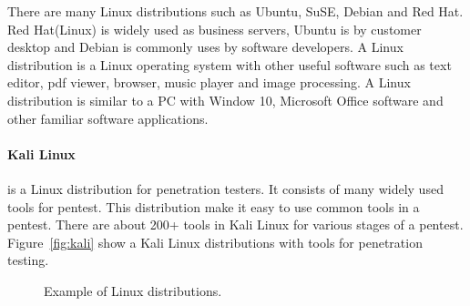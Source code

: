 \documentclass[7x9]{times}
\begin{document}
There are many Linux distributions such as Ubuntu, SuSE, Debian and
Red Hat. Red Hat(Linux) is widely used as business servers, Ubuntu is by 
customer desktop and Debian is commonly uses by software
developers. A Linux distribution is a Linux operating system with
other useful software such as text editor, pdf viewer, browser,
music player and image processing. A Linux distribution is similar to
a PC with Window 10, Microsoft Office software and other familiar
software applications.



\paragraph{Kali Linux}is a Linux distribution for penetration
testers. It consists of many widely used tools for pentest. This
distribution make it easy to use common tools in a pentest. There are
about 200+ tools in Kali Linux for various stages of a
pentest. Figure~\ref{fig:kali} show a Kali Linux distributions with
tools for penetration testing.


\begin{figure}[!t]
\centering
{}
\hfil
{}
\caption{Example of Linux distributions.}
\label{fig:linux}
\end{figure}
\end{document}
